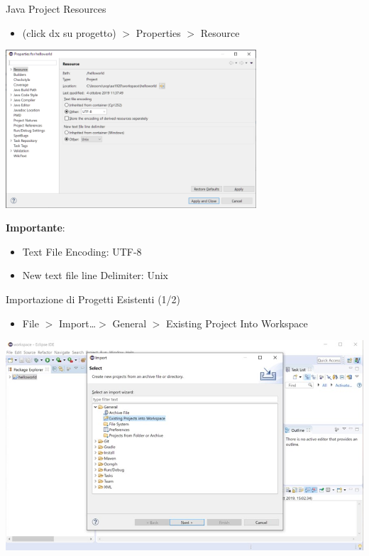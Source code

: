 \documentclass[presentation]{beamer}
\begin{document}
\begin{frame}{Java Project Resources}
\begin{itemize}
\item (click dx su progetto) $>$ Properties $>$ Resource
\end{itemize}
\begin{center}
\includegraphics[width=0.7\textwidth]{img/eclipse-screenshots/eclipse-ide-05b.png}
\end{center}
\textbf{Importante}:
\begin{itemize}
\item Text File Encoding: UTF-8
\item New text file line Delimiter: Unix
\end{itemize}
\end{frame}

\begin{frame}{Importazione di Progetti Esistenti (1/2)}
\begin{itemize}
\item File $>$ Import\dots $>$ General $>$ Existing Project Into Workspace
\end{itemize}
\begin{center}
\includegraphics[width=\textwidth]{img/eclipse-screenshots/eclipse-ide-06a.jpg}
\end{center}
\end{frame}
\end{document}
